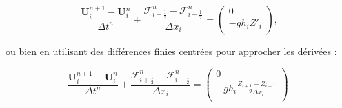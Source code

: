 \documentclass[
11pt, %
francais, %
singlespacing, %
headsepline, %
f%
]{MastersDoctoralThesis} %
\theoremstyle{definition}
\begin{document}
\[\frac{\textbf{U}_i^{n+1}-\textbf{U}_i^{n}}{\Delta t^n}+\frac{\mathcal{F}_{i+\frac{1}{2}}^n - \mathcal{F}_{i-\frac{1}{2}}^n}{\Delta x_i}= \begin{pmatrix}
0 \\
-gh_i Z'_i\\
\end{pmatrix},\]

ou bien en utilisant des différences finies centrées pour approcher les
dérivées :

\[\frac{\textbf{U}_i^{n+1}-\textbf{U}_i^{n}}{\Delta t^n}+\frac{\mathcal{F}_{i+\frac{1}{2}}^n - \mathcal{F}_{i-\frac{1}{2}}^n}{\Delta x_i}= \begin{pmatrix}
0 \\
-gh_i \frac{Z_{i+1}-Z_{i-1}}{2\Delta x_i}\\
\end{pmatrix}.\]
\end{document}
